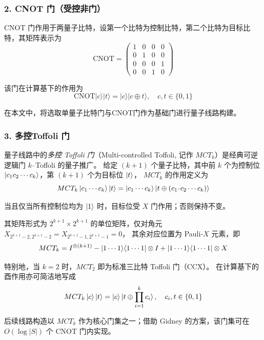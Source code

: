 \documentclass[10.5pt,compsoc,UTF8]{CjC}
\newcommand{\heiti}{\CJKfamily{STHeiti}}
\theoremstyle{mystyle}
\begin{document}
\subsubsection*{\heiti 2. CNOT 门（受控非门）}
CNOT 门作用于两量子比特，设第一个比特为控制比特，第二个比特为目标比特，其矩阵表示为
\[
\mathrm{CNOT} =
\begin{pmatrix}
1 & 0 & 0 & 0\\
0 & 1 & 0 & 0\\
0 & 0 & 0 & 1\\
0 & 0 & 1 & 0
\end{pmatrix}
\]\par
该门在计算基下的作用为
\[
\mathrm{CNOT}|c\rangle|t\rangle = |c\rangle|c\oplus t\rangle,\quad c,t\in\{0,1\}
\]\par
在本文中，将选取单量子比特门与CNOT门作为基础门进行量子线路构建。


\subsubsection*{\heiti 3. 多控Toffoli 门}

量子线路中的\emph{多控 Toffoli 门}（Multi-controlled Toffoli, 记作 $MCT_k$）是经典可逆逻辑门 $k$–Toffoli 的量子推广。
给定 $(k+1)$ 个量子比特，其中前 $k$ 个为控制位 $\ket{c_1c_2\cdots c_k}$，第 $(k+1)$ 个为目标位 $\ket{t}$，
$MCT_k$ 的作用定义为
\begin{equation}
  \label{eq:MCT-def}
  MCT_k\ket{c_1\cdots c_k}\ket{t}
  = \ket{c_1\cdots c_k}\ket{t \oplus (c_1\!\cdot\!c_2\cdots c_k)}
\end{equation}\par
当且仅当所有控制位均为 $\ket{1}$ 时，目标位受 $X$ 门作用；否则保持不变。

其矩阵形式为 $2^{k+1}\times 2^{k+1}$ 的单位矩阵，仅对角元 $X_{2^{k+1}-2,2^{k+1}-2}=X_{2^{k+1}-1,2^{k+1}-1}=0$，
其余对应位置为 Pauli-$X$ 元素，即
\begin{equation}
  \label{eq:MCT-matrix}
  MCT_k = I^{\otimes (k+1)} - \ket{1\cdots1}\!\bra{1\cdots1}\otimes I
  + \ket{1\cdots1}\!\bra{1\cdots1}\otimes X
\end{equation}

特别地，当 $k=2$ 时，$MCT_2$ 即为标准三比特 Toffoli 门（CCX）。
在计算基下的酉作用亦可简洁地写成
\begin{equation}
  MCT_k\ket{c}\ket{t} = \ket{c}\ket{t \oplus \prod_{i=1}^{k}c_i},
  \quad c_i,t\in\{0,1\}
\end{equation}

后续线路构造以 $MCT_k$ 作为核心门集之一；借助 Gidney\cite{Gidney2015} 的方案，该门集可在 $O(\log |S|)$ 个 CNOT 门内实现。
\end{document}
